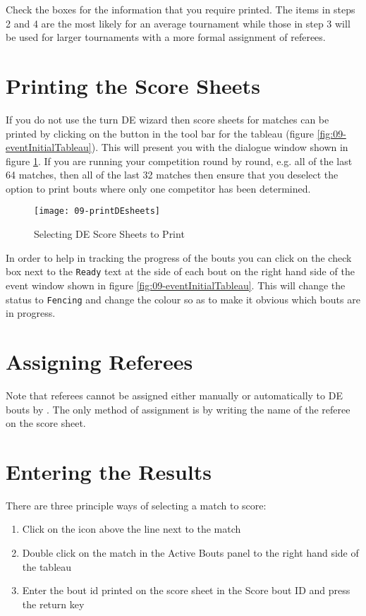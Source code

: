 \documentclass[a4paper,11pt]{memoir}
\begin{document}
Check the boxes for the information that you require printed. The items in steps 2 and 4 are the most likely for an average tournament while those in step 3 will be used for larger tournaments with a more formal assignment of referees.

\section{Printing the Score Sheets}

If you do not use the turn DE wizard then score sheets for matches can be printed by clicking on the  button in the tool bar for the tableau (figure \ref{fig:09-eventInitialTableau}). This will present you with the dialogue window shown in figure \ref{fig:09-printDEsheets}. If you are running your competition round by round, e.g. all of the last 64 matches, then all of the last 32 matches then ensure that you deselect the option to print bouts where only one competitor has been determined. 

\begin{figure}[!ht]
 \centering
 \texttt{[image: 09-printDEsheets]}
 \caption{Selecting DE Score Sheets to Print} \label{fig:09-printDEsheets}
\end{figure}

In order to help in tracking the progress of the bouts you can click on the check box next to the \texttt{Ready} text at the side of each bout on the right hand side of the event window shown in figure \ref{fig:09-eventInitialTableau}. This will change the status to \texttt{Fencing} and change the colour so as to make it obvious which bouts are in progress.

\section{Assigning Referees}

Note that referees cannot be assigned either manually or automatically to DE bouts by \fencingtime{}. The only method of assignment is by writing the name of the referee on the score sheet. 

\section{Entering the Results}

There are three principle ways of selecting a match to score:
\begin{enumerate}
 \item Click on the icon above the line next to the match 
 \item Double click on the match in the Active Bouts panel to the right hand side of the tableau 
 \item Enter the bout id printed on the score sheet in the Score bout ID and press the return key
\end{enumerate}
\end{document}
